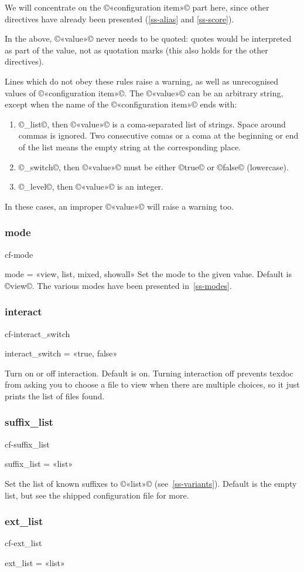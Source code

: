 \documentclass[a4paper, oneside]{scrartcl}
\newif\ifframed
\newenvironment{cmdsubsub}[2]{%
  \framedfalse \commandes\subsubsection{#1}{#2}%
  }{%
  \endcommandes}
\begin{document}
We will concentrate on the ©«configuration item»© part here, since other
directives have already been presented (\ref{ss-alias} and \ref{ss-score}).

In the above, ©«value»©  never needs to be quoted: quotes would be interpreted
as part of the value, not as quotation marks (this also holds for the other
directives).

Lines which do not obey these rules raise a warning, as well as unrecognised
values of ©«configuration item»©. The ©«value»© can be an arbitrary string,
except when the name of the ©«configuration item»© ends with:
\begin{enumerate}
  \item ©_list©, then ©«value»© is a coma-separated list of strings. Space
    around commas is ignored. Two consecutive comas or a coma at the beginning
    or end of the list means the empty string at the corresponding place.
  \item ©_switch©, then ©«value»© must be either ©true© or ©false©
    (lowercase).
  \item ©_level©, then ©«value»© is an integer.
\end{enumerate}
In these cases, an improper ©«value»© will raise a warning too.

\begin{cmdsubsub}{mode}{cf-mode}
  mode = «view, list, mixed, showall»
\end{cmdsubsub}
Set the  mode to the given value.  Default is ©view©. The various modes
have been presented in~\ref{ss-modes}.

\begin{cmdsubsub}{interact}{cf-interact_switch}
  interact_switch = «true, false»
\end{cmdsubsub}

Turn on or off interaction.  Default is on.  Turning interaction off prevents
texdoc from asking you to choose a file to view when there are multiple
choices, so it just prints the list of files found.

\begin{cmdsubsub}{suffix_list}{cf-suffix_list}
  suffix_list = «list»
\end{cmdsubsub}

Set the list of known suffixes to ©«list»© (see~\ref{ss-variants}). Default is
the empty list, but see the shipped configuration file for more.

\begin{cmdsubsub}{ext_list}{cf-ext_list}
  ext_list = «list»
\end{cmdsubsub}
\end{document}
